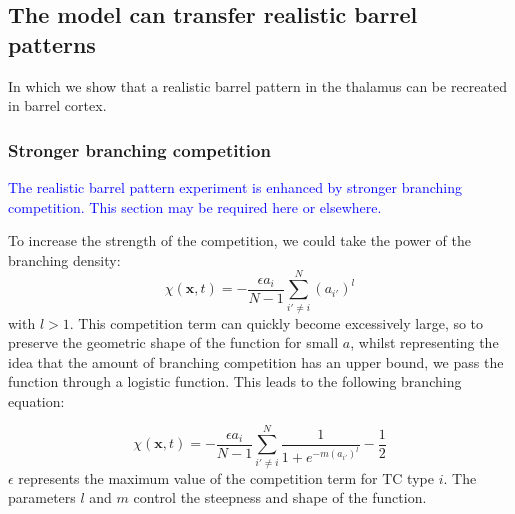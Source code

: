\documentclass[a4paper,11pt]{article}
\newcommand{\cmnt}[1]{\textcolor{blue}{#1}}
\newcommand{\mb}[1]{\mathbf{#1}}
\begin{document}
\subsection*{The model can transfer realistic barrel patterns}

In which we show that a realistic barrel pattern in the thalamus can be
recreated in barrel cortex.

\subsubsection*{Stronger branching competition}

\cmnt{The realistic barrel pattern experiment is enhanced by stronger
  branching competition. This section may be required here or elsewhere.}

To increase the strength of the competition, we could take the power
of the branching density:
%
\begin{equation} \label{eq:branch_comp_pow}
\chi(\mb{x}, t) = - \frac{\epsilon  a_i}{N-1} \sum_{i' \ne i}^{N} (a_{i'})^l
\end{equation}
%
with $l>1$. This competition term can quickly become excessively large, so to
preserve the geometric shape of the function for small $a$, whilst
representing the idea that the amount of branching competition has an upper
bound, we pass the function through a logistic function.  This leads to the
following branching equation:

%
\begin{equation} \label{eq:branch_comp_pow_logistic}
\chi(\mb{x}, t) = - \frac{\epsilon a_i}{N-1} \sum_{i' \ne i}^{N}
\frac{1}{1 + e^{-m (a_{i'})^l}} - \frac{1}{2}
\end{equation}
%
$\epsilon$ represents the maximum value of the competition term for TC type
$i$. The parameters $l$ and $m$ control the steepness and shape of the
function.

\end{document}
